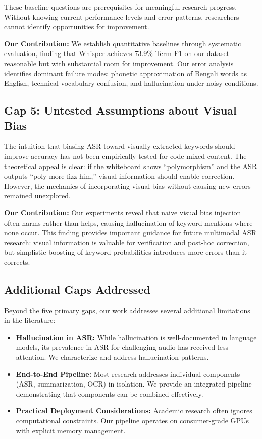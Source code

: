 These baseline questions are prerequisites for meaningful research progress. Without knowing current performance levels and error patterns, researchers cannot identify opportunities for improvement.

\textbf{Our Contribution:} We establish quantitative baselines through systematic evaluation, finding that Whisper achieves 73.9\% Term F1 on our dataset---reasonable but with substantial room for improvement. Our error analysis identifies dominant failure modes: phonetic approximation of Bengali words as English, technical vocabulary confusion, and hallucination under noisy conditions.

\subsection{Gap 5: Untested Assumptions about Visual Bias}

The intuition that biasing ASR toward visually-extracted keywords should improve accuracy has not been empirically tested for code-mixed content. The theoretical appeal is clear: if the whiteboard shows ``polymorphism'' and the ASR outputs ``poly more fizz him,'' visual information should enable correction. However, the mechanics of incorporating visual bias without causing new errors remained unexplored.

\textbf{Our Contribution:} Our experiments reveal that naive visual bias injection often harms rather than helps, causing hallucination of keyword mentions where none occur. This finding provides important guidance for future multimodal ASR research: visual information is valuable for verification and post-hoc correction, but simplistic boosting of keyword probabilities introduces more errors than it corrects.

\subsection{Additional Gaps Addressed}

Beyond the five primary gaps, our work addresses several additional limitations in the literature:

\begin{itemize}
    \item \textbf{Hallucination in ASR:} While hallucination is well-documented in language models, its prevalence in ASR for challenging audio has received less attention. We characterize and address hallucination patterns.
    
    \item \textbf{End-to-End Pipeline:} Most research addresses individual components (ASR, summarization, OCR) in isolation. We provide an integrated pipeline demonstrating that components can be combined effectively.
    
    \item \textbf{Practical Deployment Considerations:} Academic research often ignores computational constraints. Our pipeline operates on consumer-grade GPUs with explicit memory management.
\end{itemize}

